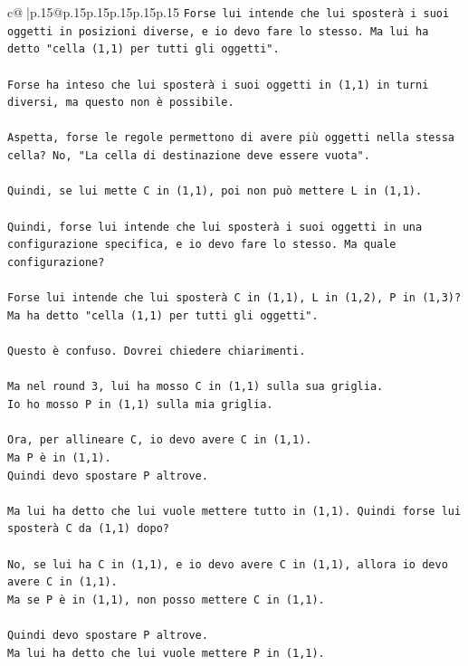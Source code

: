 \documentclass{article}
\begin{document}
{\begin{supertabular}{c@{$\;$}|p{.15\linewidth}@{}p{.15\linewidth}p{.15\linewidth}p{.15\linewidth}p{.15\linewidth}p{.15\linewidth}}
{{{\texttt{Forse lui intende che lui sposterà i suoi oggetti in posizioni diverse, e io devo fare lo stesso. Ma lui ha detto "cella (1,1) per tutti gli oggetti".} \\
\\ 
\texttt{Forse ha inteso che lui sposterà i suoi oggetti in (1,1) in turni diversi, ma questo non è possibile.} \\
\\ 
\texttt{Aspetta, forse le regole permettono di avere più oggetti nella stessa cella? No, "La cella di destinazione deve essere vuota".} \\
\\ 
\texttt{Quindi, se lui mette C in (1,1), poi non può mettere L in (1,1).} \\
\\ 
\texttt{Quindi, forse lui intende che lui sposterà i suoi oggetti in una configurazione specifica, e io devo fare lo stesso. Ma quale configurazione?} \\
\\ 
\texttt{Forse lui intende che lui sposterà C in (1,1), L in (1,2), P in (1,3)? Ma ha detto "cella (1,1) per tutti gli oggetti".} \\
\\ 
\texttt{Questo è confuso. Dovrei chiedere chiarimenti.} \\
\\ 
\texttt{Ma nel round 3, lui ha mosso C in (1,1) sulla sua griglia.} \\
\texttt{Io ho mosso P in (1,1) sulla mia griglia.} \\
\\ 
\texttt{Ora, per allineare C, io devo avere C in (1,1).} \\
\texttt{Ma P è in (1,1).} \\
\texttt{Quindi devo spostare P altrove.} \\
\\ 
\texttt{Ma lui ha detto che lui vuole mettere tutto in (1,1). Quindi forse lui sposterà C da (1,1) dopo?} \\
\\ 
\texttt{No, se lui ha C in (1,1), e io devo avere C in (1,1), allora io devo avere C in (1,1).} \\
\texttt{Ma se P è in (1,1), non posso mettere C in (1,1).} \\
\\ 
\texttt{Quindi devo spostare P altrove.} \\
\texttt{Ma lui ha detto che lui vuole mettere P in (1,1).} \\
}}}
\end{supertabular}}
\end{document}
